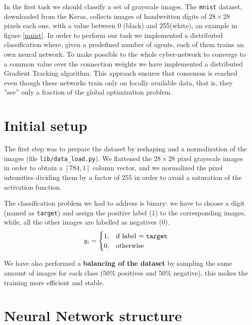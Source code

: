 \documentclass[a4paper,11pt,oneside]{book}
\begin{document}
In the first task we should classify a set of grayscale images. The \texttt{mnist} dataset, downloaded from the Keras, collects images of handwritten digits of $28\times28$ pixels each one, with a value between 0 (black) and 255(white), an example in figure \ref{mnist}. In order to perform our task we implemented a distributed classification where, given a predefined number of agents, each of them trains an own neural network. To make possible to the whole cyber-network to converge to a common value over the connection weights we have implemented a distributed Gradient Tracking algorithm. This approach ensures that consensus is reached even though these networks train only on locally available data, that is, they ''see'' only a fraction of the global optimization problem.

\section{Initial setup}
The first step was to prepare the dataset by reshaping and a normalization of the images (file \texttt{lib/data\_load.py}). We flattened the $28\times28$ pixel grayscale images in order to obtain a $[784,1]$ column vector, and we normalized the pixel intensities dividing them by a factor of $255$ in order to avoid a saturation of the activation function.

\bigskip
The classification problem we had to address is binary: we have to choose a digit (named as \texttt{target}) and assign the positive label ($1$) to the corresponding images, while, all the other images are labelled as negatives ($0$).
\begin{equation}
y_i = 
\begin{cases}
1, & \text{if label = \texttt{target}} \\
0, & \text{otherwise}
\end{cases}
\end{equation}

We have also performed a \textbf{balancing of the dataset} by sampling the same amount of images for each class ($50\%$ positives and $50\%$ negative), this makes the training more efficient and stable.

\section{Neural Network structure}
\end{document}

